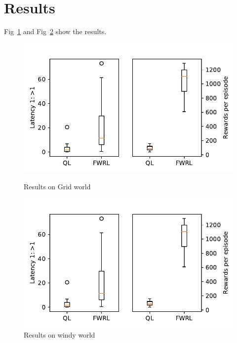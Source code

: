 \documentclass[letterpaper]{article} %
\begin{document}
\section{Results}

Fig~\ref{fig:ql-fw-grid-world-results} and Fig~\ref{fig:ql-fw-windy-world-results} show the results.

\begin{figure}%
\includegraphics[width=\columnwidth]{./media/ql-fw-grid-world.pdf}\\
\caption{Results on Grid world}
\label{fig:ql-fw-grid-world-results}%
\end{figure}
\begin{figure}
\includegraphics[width=\columnwidth]{./media/ql-fw-windy-world.pdf}%
\caption{Results on windy world}
\label{fig:ql-fw-windy-world-results}%
\end{figure}
\end{document}
